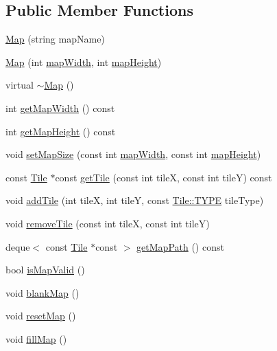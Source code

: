 \subsection*{Public Member Functions}
\begin{DoxyCompactItemize}
\item 
\hyperlink{class_map_a11a8645ff656f9efeb5a6758b36d1264}{Map} (string map\+Name)
\item 
\hyperlink{class_map_af3e300404b4bdacb2761300cb3cc1eda}{Map} (int \hyperlink{class_map_a9660b072c56d69d3639e364835f0188d}{map\+Width}, int \hyperlink{class_map_a4674385319ae4f0c6672f4fe69f97b5c}{map\+Height})
\item 
virtual \hyperlink{class_map_aa403fbe09394ccf39747588f5168e3b2}{$\sim$\+Map} ()
\item 
int \hyperlink{class_map_a59b1f7d135d6a62ba210585951f4f419}{get\+Map\+Width} () const 
\item 
int \hyperlink{class_map_a076782bd4ca4a53eb57a894b336f5090}{get\+Map\+Height} () const 
\item 
void \hyperlink{class_map_a3079c08faaa2fd3984bed5471488a790}{set\+Map\+Size} (const int \hyperlink{class_map_a9660b072c56d69d3639e364835f0188d}{map\+Width}, const int \hyperlink{class_map_a4674385319ae4f0c6672f4fe69f97b5c}{map\+Height})
\item 
const \hyperlink{class_tile}{Tile} $\ast$const \hyperlink{class_map_aa8e57f0e6d665def93ad7b33413e98a7}{get\+Tile} (const int tile\+X, const int tile\+Y) const 
\item 
void \hyperlink{class_map_ab9561f11877716cf4687ed4dab54d7db}{add\+Tile} (int tile\+X, int tile\+Y, const \hyperlink{class_tile_acb53d82f9dacff45a98acc63276928eb}{Tile\+::\+T\+Y\+P\+E} tile\+Type)
\item 
void \hyperlink{class_map_a69be425dd99011951d8c4f08b598703b}{remove\+Tile} (const int tile\+X, const int tile\+Y)
\item 
deque$<$ const \hyperlink{class_tile}{Tile} $\ast$const  $>$ \hyperlink{class_map_a0fb29a18390a3008cab71f602aa4209b}{get\+Map\+Path} () const 
\item 
bool \hyperlink{class_map_a915168b8ce4bb812c591e34d17163a75}{is\+Map\+Valid} ()
\item 
void \hyperlink{class_map_afa8798ebce5315b393755d8656fa6038}{blank\+Map} ()
\item 
void \hyperlink{class_map_a79a7d2715d8face71c5f16be9e14ac0a}{reset\+Map} ()
\item 
void \hyperlink{class_map_a9e82077ad5054dbbe6434cf89738dbf5}{fill\+Map} ()

\end{DoxyCompactItemize}
